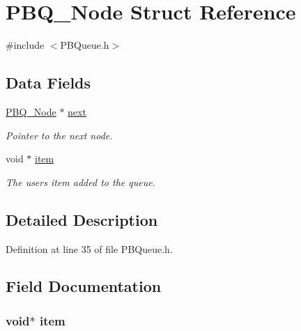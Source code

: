 \hypertarget{struct_p_b_q___node}{}\section{P\+B\+Q\+\_\+\+Node Struct Reference}
\label{struct_p_b_q___node}


{\ttfamily \#include $<$P\+B\+Queue.\+h$>$}

\subsection*{Data Fields}
\begin{DoxyCompactItemize}
\item 
\hyperlink{struct_p_b_q___node}{P\+B\+Q\+\_\+\+Node} $\ast$ \hyperlink{struct_p_b_q___node_afe40ce6cc59853da2df37681483060b4}{next}
\begin{DoxyCompactList}\small\item\em Pointer to the next node. \end{DoxyCompactList}\item 
void $\ast$ \hyperlink{struct_p_b_q___node_aeeeae972d4d97226aa998aa9ca91346c}{item}
\begin{DoxyCompactList}\small\item\em The user\textquotesingle{}s item added to the queue. \end{DoxyCompactList}\end{DoxyCompactItemize}


\subsection{Detailed Description}


Definition at line 35 of file P\+B\+Queue.\+h.



\subsection{Field Documentation}
\hypertarget{struct_p_b_q___node_aeeeae972d4d97226aa998aa9ca91346c}{}
\subsubsection[{item}]{\setlength{\rightskip}{0pt plus 5cm}void$\ast$ item}\label{struct_p_b_q___node_aeeeae972d4d97226aa998aa9ca91346c}


